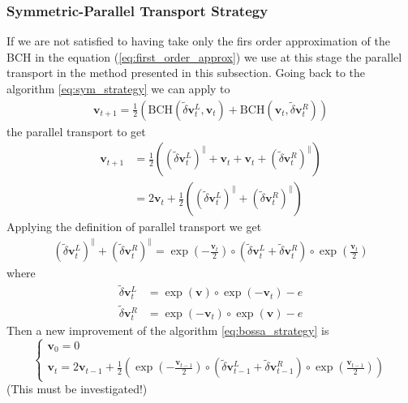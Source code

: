 \subsubsection{Symmetric-Parallel Transport Strategy}
If we are not satisfied to having take only the firs order approximation of the BCH in the equation (\ref{eq:first_order_approx}) we use at this stage the parallel transport in the method presented in this subsection.
Going back to the algorithm \ref{eq:sym_strategy} we can apply to
\begin{align*}
\mathbf{v}_{t+1} = \frac{1}{2}(\text{BCH}(\tilde{\delta} \mathbf{v}^{L}_{t}, \mathbf{v}_{t}) + \text{BCH}(\mathbf{v}_{t},\tilde{\delta} \mathbf{v}^{R}_{t}))
\end{align*}
the parallel transport to get
\begin{align*}
\mathbf{v}_{t+1} &= \frac{1}{2}((\tilde{\delta} \mathbf{v}^{L}_{t})^{\parallel} + \mathbf{v}_{t} + \mathbf{v}_{t} + (\tilde{\delta} \mathbf{v}^{R}_{t})^{\parallel}) \\
&= 2\mathbf{v}_{t} + \frac{1}{2}((\tilde{\delta} \mathbf{v}^{L}_{t})^{\parallel} + (\tilde{\delta} \mathbf{v}^{R}_{t})^{\parallel})
\end{align*}
Applying the definition of parallel transport we get
\begin{align*}
(\tilde{\delta} \mathbf{v}^{L}_{t})^{\parallel} + (\tilde{\delta} \mathbf{v}^{R}_{t})^{\parallel} 
= 
\exp(-\frac{\mathbf{v}_{t}}{2}) \circ (\tilde{\delta} \mathbf{v}^{L}_{t} +\tilde{\delta} \mathbf{v}^{R}_{t} )\circ \exp(\frac{\mathbf{v}_{t}}{2})
\end{align*}
where 
\begin{align*}
\tilde{\delta} \mathbf{v}^{L}_{t} &=  \exp(\mathbf{v})\circ \exp(-\mathbf{v}_{t}) - e \\
\tilde{\delta} \mathbf{v}^{R}_{t} &=  \exp(-\mathbf{v}_{t})\circ \exp(\mathbf{v}) - e
\end{align*}
Then a new improvement of the algorithm \ref{eq:bossa_strategy}  is
\begin{equation}\label{eq:sym_parallel_strategy}
\begin{cases}
\mathbf{v}_0 = 0 \\
\mathbf{v}_{t} 
=  
2\mathbf{v}_{t-1} + \frac{1}{2}(\exp(-\frac{\mathbf{v}_{t-1}}{2}) 
\circ 
(\tilde{\delta} \mathbf{v}^{L}_{t-1} +\tilde{\delta} \mathbf{v}^{R}_{t-1} )\circ \exp(\frac{\mathbf{v}_{t-1}}{2}))
\end{cases}
\end{equation}
(This must be investigated!)


